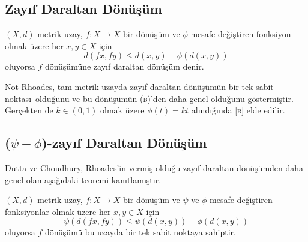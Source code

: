 \documentclass[8pt]{beamer}
\begin{document}
\subsection{Zay\i f Daraltan D\"{o}n\"{u}\c{s}\"{u}m}
\begin{frame}
  \begin{definition}
     $(X,d)$ metrik uzay, $f: X \rightarrow X$ bir d\"{o}n\"{u}\c{s}\"{u}m ve $\phi$ mesafe de\u{g}i\c{s}tiren fonksiyon olmak \"uzere her $x, y\in X$ i\c{c}in
     \begin{equation*}
       d(fx,fy)\leq d(x,y)-\phi(d(x,y))
     \end{equation*}
oluyorsa $f$ d\"{o}n\"{u}\c{s}\"{u}m\"{u}ne zay\i f daraltan d\"{o}n\"{u}\c{s}\"{u}m denir.
  \end{definition}
  \begin{block}{Not}
    Rhoades\cite{Rhoades2001}, tam metrik uzayda zay\i f daraltan
    d\"{o}n\"{u}\c{s}\"{u}m\"un bir tek sabit noktas\i \ oldu\u{g}unu
    ve bu d\"{o}n\"{u}\c{s}\"{u}m\"un \textsc{(b)}'den daha genel
    oldu\u{g}unu g\"ostermi\c{s}tir. Ger\c{c}ekten de $k\in(0,1)$
    olmak \"uzere $\phi(t)=kt$ al\i nd\i \u{g}\i nda \textsc{[b]} elde
    edilir.
  \end{block}

\end{frame}

\subsection{($\psi-\phi$)-zay\i f Daraltan D\"{o}n\"{u}\c{s}\"{u}m}
\begin{frame}
Dutta ve Choudhury\cite{Dutta2008}, Rhoades\cite{Rhoades2001}'in vermi\c{s} oldu\u{g}u zay\i f daraltan d\"{o}n\"{u}\c{s}\"{u}mden daha genel olan a\c{s}a\u{g}\i daki teoremi kan\i tlam\i \c{s}t\i r.
  \begin{theorem}
     $(X,d)$ metrik uzay, $f: X \rightarrow X$ bir d\"{o}n\"{u}\c{s}\"{u}m ve $\psi$ ve $\phi$ mesafe de\u{g}i\c{s}tiren fonksiyonlar olmak \"uzere her $x, y\in X$ i\c{c}in
     \begin{equation*}
       \psi(d(fx,fy))\leq \psi(d(x,y))-\phi(d(x,y))
     \end{equation*}
oluyorsa $f$ d\"{o}n\"{u}\c{s}\"{u}m\"{u} bu uzayda bir tek sabit noktaya sahiptir.
  \end{theorem}
\end{frame}
\end{document}
